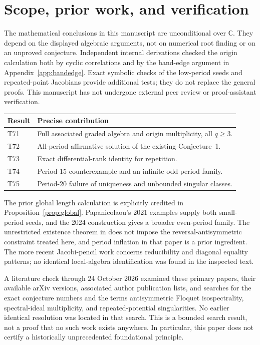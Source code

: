 \documentclass[11pt,a4paper]{article}
\theoremstyle{definition}
\theoremstyle{remark}
\newcommand{\C}{\mathbb C}
\begin{document}
\section{Scope, prior work, and verification}\label{sec:scope}

The mathematical conclusions in this manuscript are unconditional over
$\C$. They depend on the displayed algebraic arguments, not on numerical
root finding or on an unproved conjecture. Independent internal derivations
checked the origin calculation both by cyclic correlations and by the
band-edge argument in Appendix~\ref{app:bandedge}. Exact symbolic checks of
the low-period seeds and repeated-point Jacobians provide additional tests;
they do not replace the general proofs. This manuscript has not undergone
external peer review or proof-assistant verification.

\begin{center}
\begin{tabular}{@{}p{}p{}@{}}
\toprule
Result & Precise contribution \\
\midrule
T71 & Full associated graded algebra and origin multiplicity, all $q\geq3$.\\
T72 & All-period affirmative solution of the existing Conjecture~1.\\
T73 & Exact differential-rank identity for repetition.\\
T74 & Period-15 counterexample and an infinite odd-period family.\\
T75 & Period-20 failure of uniqueness and unbounded singular classes.\\
\bottomrule
\end{tabular}
\end{center}

The prior global length calculation is explicitly credited in
Proposition~\ref{prop:global}. Papanicolaou's 2021 examples
\cite{Papanicolaou} supply both small-period seeds, and the 2024 construction
\cite{FLMPRTTZ} gives a broader even-period family.
The unrestricted existence theorem in \cite{CFK}
does not impose the reversal-antisymmetric constraint treated here, and
period inflation in that paper is a prior ingredient. The more recent
Jacobi-pencil work \cite{FaustJacobi} concerns reducibility and diagonal
equality patterns; no identical local-algebra identification was found in
the inspected text.

A literature check through 24 October 2026 examined these primary papers,
their available arXiv versions, associated author publication lists, and
searches for the exact conjecture numbers and the terms antisymmetric
Floquet isospectrality, spectral-ideal multiplicity, and repeated-potential
singularities. No earlier identical resolution was located in that search.
This is a bounded search result, not a proof that no such work exists
anywhere. In particular, this paper does not certify a historically
unprecedented foundational principle.
\end{document}
